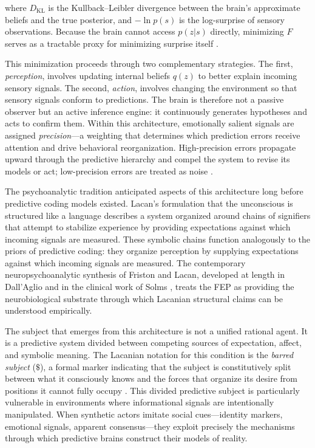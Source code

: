 \documentclass[12pt,a4paper]{article}
\begin{document}
where $D_{\mathrm{KL}}$ is the Kullback--Leibler divergence between the brain's approximate
beliefs and the true posterior, and $-\ln p(s)$ is the log-surprise of sensory observations.
Because the brain cannot access $p(z|s)$ directly, minimizing $F$ serves as a tractable proxy
for minimizing surprise itself \citep{friston2010}.

This minimization proceeds through two complementary strategies. The first, \emph{perception},
involves updating internal beliefs $q(z)$ to better explain incoming sensory signals. The
second, \emph{action}, involves changing the environment so that sensory signals conform to
predictions. The brain is therefore not a passive observer but an active inference engine:
it continuously generates hypotheses and acts to confirm them. Within this architecture,
emotionally salient signals are assigned \emph{precision}---a weighting that determines which
prediction errors receive attention and drive behavioral reorganization. High-precision errors
propagate upward through the predictive hierarchy and compel the system to revise its models
or act; low-precision errors are treated as noise \citep{friston2013,solms2021}.

The psychoanalytic tradition anticipated aspects of this architecture long before predictive
coding models existed. Lacan's formulation that the unconscious is structured like a language
\citep{lacan2006} describes a system organized around chains of signifiers that attempt to
stabilize experience by providing expectations against which incoming signals are measured.
These symbolic chains function analogously to the priors of predictive coding: they organize
perception by supplying expectations against which incoming signals are measured. The
contemporary neuropsychoanalytic synthesis of Friston and Lacan, developed at length in
Dall'Aglio \citep{dallaglio2024} and in the clinical work of Solms \citep{solms2021}, treats
the FEP as providing the neurobiological substrate through which Lacanian structural claims
can be understood empirically.

The subject that emerges from this architecture is not a unified rational agent. It is a
predictive system divided between competing sources of expectation, affect, and symbolic meaning.
The Lacanian notation for this condition is the \emph{barred subject} ($\$$), a formal marker
indicating that the subject is constitutively split between what it consciously knows and the
forces that organize its desire from positions it cannot fully occupy \citep{lacan2006,dallaglio2024}.
This divided predictive subject is particularly vulnerable in environments where informational
signals are intentionally manipulated. When synthetic actors imitate social cues---identity
markers, emotional signals, apparent consensus---they exploit precisely the mechanisms through
which predictive brains construct their models of reality.
\end{document}
